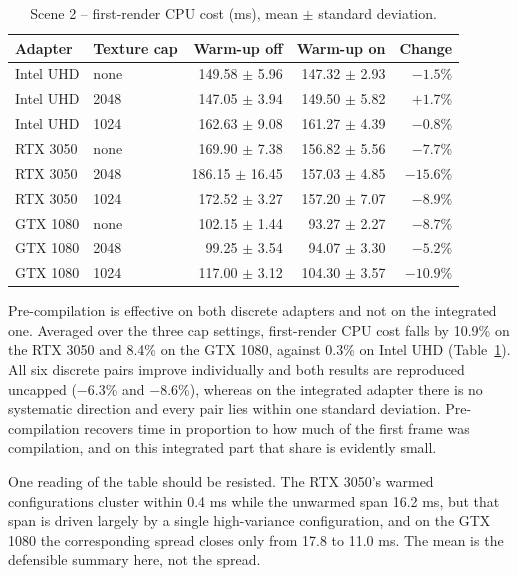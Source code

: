 \begin{table}[H]
\centering\small\setlength{\tabcolsep}{5pt}
\caption{Scene 2 -- first-render CPU cost (ms), mean $\pm$ standard deviation.}
\label{tab:warmup}
\begin{tabular}{llrrr}
\toprule
Adapter & Texture cap & Warm-up off & Warm-up on & Change \\
\midrule
Intel UHD & none & 149.58 $\pm$ 5.96  & 147.32 $\pm$ 2.93 & $-1.5$\% \\
Intel UHD & 2048 & 147.05 $\pm$ 3.94  & 149.50 $\pm$ 5.82 & $+1.7$\% \\
Intel UHD & 1024 & 162.63 $\pm$ 9.08  & 161.27 $\pm$ 4.39 & $-0.8$\% \\
\midrule
RTX 3050  & none & 169.90 $\pm$ 7.38  & 156.82 $\pm$ 5.56 & $-7.7$\% \\
RTX 3050  & 2048 & 186.15 $\pm$ 16.45 & 157.03 $\pm$ 4.85 & $-15.6$\% \\
RTX 3050  & 1024 & 172.52 $\pm$ 3.27  & 157.20 $\pm$ 7.07 & $-8.9$\% \\
\midrule
GTX 1080  & none & 102.15 $\pm$ 1.44  & 93.27 $\pm$ 2.27  & $-8.7$\% \\
GTX 1080  & 2048 & 99.25 $\pm$ 3.54   & 94.07 $\pm$ 3.30  & $-5.2$\% \\
GTX 1080  & 1024 & 117.00 $\pm$ 3.12  & 104.30 $\pm$ 3.57 & $-10.9$\% \\
\bottomrule
\end{tabular}
\end{table}

Pre-compilation is effective on both discrete adapters and not on the integrated one. Averaged over the three cap settings, first-render CPU cost falls by 10.9\% on the RTX 3050 and 8.4\% on the GTX 1080, against 0.3\% on Intel UHD (Table~\ref{tab:warmup}). All six discrete pairs improve individually and both results are reproduced uncapped ($-6.3$\% and $-8.6$\%), whereas on the integrated adapter there is no systematic direction and every pair lies within one standard deviation. Pre-compilation recovers time in proportion to how much of the first frame was compilation, and on this integrated part that share is evidently small.

One reading of the table should be resisted. The RTX 3050's warmed configurations cluster within 0.4 ms while the unwarmed span 16.2 ms, but that span is driven largely by a single high-variance configuration, and on the GTX 1080 the corresponding spread closes only from 17.8 to 11.0 ms. The mean is the defensible summary here, not the spread.

